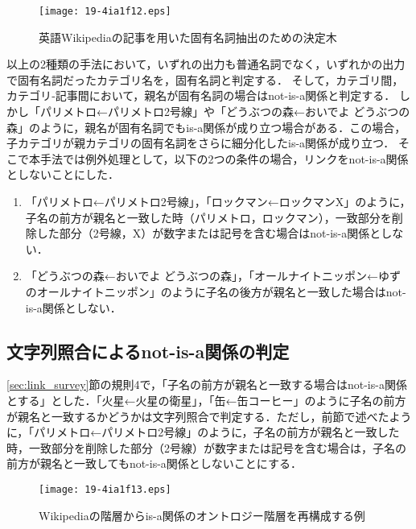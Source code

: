 \documentclass[japanese]{jnlp_1.4}
\begin{document}
\begin{figure}[t]
\begin{center}
\texttt{[image: 19-4ia1f12.eps]}
\end{center}
\caption{英語Wikipediaの記事を用いた固有名詞抽出のための決定木}
\label{fig:koyu_enwiki_kizi}
\end{figure}

以上の2種類の手法において，いずれの出力も普通名詞でなく，いずれかの出力で固有名詞だったカテゴリ名を，固有名詞と判定する．
そして，カテゴリ間，カテゴリ‐記事間において，親名が固有名詞の場合はnot-is-a関係と判定する．
しかし「パリメトロ←パリメトロ2号線」や「どうぶつの森←おいでよ どうぶつの森」のように，親名が固有名詞でもis-a関係が成り立つ場合がある．この場合，子カテゴリが親カテゴリの固有名詞をさらに細分化したis-a関係が成り立つ．
そこで本手法では例外処理として，以下の2つの条件の場合，リンクをnot-is-a関係としないことにした．

\begin{enumerate}
\item
「パリメトロ←パリメトロ2号線」，「ロックマン←ロックマンX」のように，子名の前方が親名と一致した時（パリメトロ，ロックマン），一致部分を削除した部分（2号線，X）が数字または記号を含む場合はnot-is-a関係としない．
\item
「どうぶつの森←おいでよ どうぶつの森」，「オールナイトニッポン←ゆずのオールナイトニッポン」のように子名の後方が親名と一致した場合はnot-is-a関係としない．
\end{enumerate}


\subsection{文字列照合によるnot-is-a関係の判定}
\label{sec:pattern}

\ref{sec:link_survey}節の規則4で，「子名の前方が親名と一致する場合はnot-is-a関係とする」とした．「火星←火星の衛星」，「缶←缶コーヒー」のように子名の前方が親名と一致するかどうかは文字列照合で判定する．ただし，前節で述べたように，「パリメトロ←パリメトロ2号線」のように，子名の前方が親名と一致した時，一致部分を削除した部分（2号線）が数字または記号を含む場合は，子名の前方が親名と一致してもnot-is-a関係としないことにする．


\begin{figure}[p]
\begin{center}
\texttt{[image: 19-4ia1f13.eps]}
\end{center}
\caption{Wikipediaの階層からis-a関係のオントロジー階層を再構成する例}
\label{fig:onto_saikousei}
\end{figure}
\end{document}
